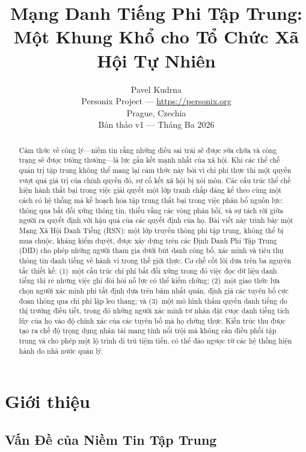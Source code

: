 \documentclass[11pt,a4paper,twocolumn]{article}
\title{\textbf{Mạng Danh Tiếng Phi Tập Trung:\\Một Khung Khổ cho Tổ Chức Xã Hội Tự Nhiên}}
\author{Pavel Kudrna\\Personix Project --- \url{https://personix.org}\\Prague, Czechia\\Bản thảo v1 --- Tháng Ba 2026}
\date{}
\begin{document}
\maketitle

\begin{abstract}
Cảm thức về công lý---niềm tin rằng những điều sai trái sẽ được sửa chữa và công trạng sẽ được tưởng thưởng---là lực gắn kết mạnh nhất của xã hội. Khi các thể chế quản trị tập trung không thể mang lại cảm thức này bởi vì chi phí thực thi một quyền vượt quá giá trị của chính quyền đó, sự cố kết xã hội bị xói mòn. Các cấu trúc thể chế hiện hành thất bại trong việc giải quyết một lớp tranh chấp đáng kể theo cùng một cách có hệ thống mà kế hoạch hóa tập trung thất bại trong việc phân bổ nguồn lực: thông qua bất đối xứng thông tin, thiếu vắng các vòng phản hồi, và sự tách rời giữa người ra quyết định với hậu quả của các quyết định của họ. Bài viết này trình bày một Mạng Xã Hội Danh Tiếng (RSN): một lớp truyền thông phi tập trung, không thể bị mua chuộc, kháng kiểm duyệt, được xây dựng trên các Định Danh Phi Tập Trung (DID) cho phép những người tham gia dưới bút danh công bố, xác minh và tiêu thụ thông tin danh tiếng về hành vi trong thế giới thực. Cơ chế cốt lõi dựa trên ba nguyên tắc thiết kế: (1)~một cấu trúc chi phí bất đối xứng trong đó việc đọc dữ liệu danh tiếng thì rẻ nhưng việc ghi đòi hỏi nỗ lực có thể kiểm chứng; (2)~một giao thức lựa chọn người xác minh phi tất định dựa trên băm nhất quán, định giá các tuyên bố cực đoan thông qua chi phí lặp leo thang; và (3)~một mô hình thẩm quyền danh tiếng do thị trường điều tiết, trong đó những người xác minh tư nhân đặt cược danh tiếng tích lũy của họ vào độ chính xác của các tuyên bố mà họ chứng thực. Kiến trúc thu được tạo ra chế độ trọng dụng nhân tài mang tính nổi trội mà không cần điều phối tập trung và cho phép một lộ trình di trú tiệm tiến, có thể đảo ngược từ các hệ thống hiện hành do nhà nước quản lý.
\end{abstract}

\section{Giới thiệu}

\subsection{Vấn Đề của Niềm Tin Tập Trung}
\end{document}
